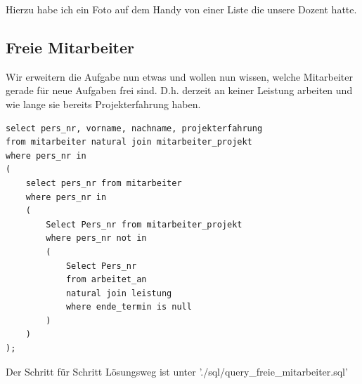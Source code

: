 \documentclass[a4paper]{article}
\begin{document}
Hierzu habe ich ein Foto auf dem Handy von einer Liste die unsere Dozent hatte.

\subsection{Freie Mitarbeiter}

Wir erweitern die Aufgabe nun etwas und wollen nun wissen, welche Mitarbeiter gerade für neue Aufgaben frei sind. D.h. derzeit an keiner Leistung arbeiten und wie lange sie bereits Projekterfahrung haben.

\begin{lstlisting}
select pers_nr, vorname, nachname, projekterfahrung
from mitarbeiter natural join mitarbeiter_projekt
where pers_nr in
(
	select pers_nr from mitarbeiter
	where pers_nr in
	(
		Select Pers_nr from mitarbeiter_projekt
		where pers_nr not in
		(
			Select Pers_nr
			from arbeitet_an
			natural join leistung
			where ende_termin is null
		)
	)
);
\end{lstlisting}

Der Schritt für Schritt Lösungsweg ist unter './sql/query\_freie\_mitarbeiter.sql'
\end{document}
